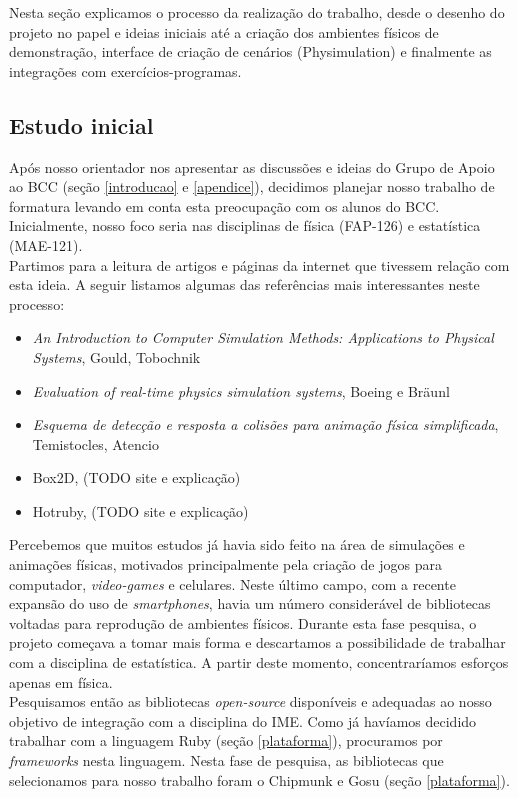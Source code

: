 Nesta seção explicamos o processo da realização do trabalho, desde o desenho do projeto no papel e ideias iniciais até a criação dos ambientes físicos de demonstração, interface de criação de cenários (Physimulation) e finalmente as integrações com exercícios-programas.

\subsection{Estudo inicial}
Após nosso orientador nos apresentar as discussões e ideias do Grupo de Apoio ao BCC (seção \ref{introducao} e \ref{apendice}), decidimos planejar nosso trabalho de formatura levando em conta esta preocupação com os alunos do BCC. Inicialmente, nosso foco seria nas disciplinas de física (FAP-126) e estatística (MAE-121). \\

Partimos para a leitura de artigos e páginas da internet que tivessem relação com esta ideia. A seguir listamos algumas das referências mais interessantes neste processo:
\begin{itemize}
	\item \textit{An Introduction to Computer Simulation Methods: Applications to Physical Systems}, Gould, Tobochnik
	\item \textit{Evaluation of real-time physics simulation systems}, Boeing e Bräunl
	\item \textit{Esquema de detecção e resposta a colisões para animação física simplificada}, Temistocles, Atencio
	\item Box2D, (TODO site e explicação)
	\item Hotruby, (TODO site e explicação)
\end{itemize}

Percebemos que muitos estudos já havia sido feito na área de simulações e animações físicas, motivados principalmente pela criação de jogos para computador, \textit{video-games} e celulares. Neste último campo, com a recente expansão do uso de \textit{smartphones}, havia um número considerável de bibliotecas voltadas para reprodução de ambientes físicos. Durante esta fase pesquisa, o projeto começava a tomar mais forma e descartamos a possibilidade de trabalhar com a disciplina de estatística. A partir deste momento, concentraríamos esforços apenas em física. \\

Pesquisamos então as bibliotecas \textit{open-source} disponíveis e adequadas ao nosso objetivo de integração com a disciplina do IME.
Como já havíamos decidido trabalhar com a linguagem Ruby (seção \ref{plataforma}), procuramos por \textit{frameworks} nesta linguagem. Nesta fase de pesquisa, as bibliotecas que selecionamos para nosso trabalho foram o Chipmunk e Gosu (seção \ref{plataforma}). 

